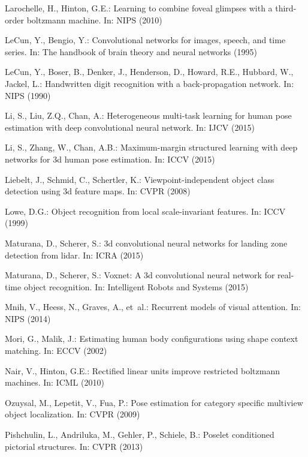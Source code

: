\documentclass[runningheads]{llncs}
\begin{document}
\begin{thebibliography}{10}
	Larochelle, H., Hinton, G.E.: Learning to combine foveal glimpses with a
	third-order boltzmann machine. In: NIPS (2010)

	LeCun, Y., Bengio, Y.: Convolutional networks for images, speech, and time
	series. In: The handbook of brain theory and neural networks (1995)

	LeCun, Y., Boser, B., Denker, J., Henderson, D., Howard, R.E., Hubbard, W.,
	Jackel, L.: Handwritten digit recognition with a back-propagation network.
	In: NIPS (1990)

	Li, S., Liu, Z.Q., Chan, A.: Heterogeneous multi-task learning for human pose
	estimation with deep convolutional neural network. In: IJCV (2015)

	Li, S., Zhang, W., Chan, A.B.: Maximum-margin structured learning with deep
	networks for 3d human pose estimation. In: ICCV (2015)

	Liebelt, J., Schmid, C., Schertler, K.: Viewpoint-independent object class
	detection using 3d feature maps. In: CVPR (2008)

	Lowe, D.G.: Object recognition from local scale-invariant features. In: ICCV
	(1999)

	Maturana, D., Scherer, S.: 3d convolutional neural networks for landing zone
	detection from lidar. In: ICRA (2015)

	Maturana, D., Scherer, S.: Voxnet: A 3d convolutional neural network for
	real-time object recognition. In: Intelligent Robots and Systems (2015)

	Mnih, V., Heess, N., Graves, A., et~al.: Recurrent models of visual attention.
	In: NIPS (2014)

	Mori, G., Malik, J.: Estimating human body configurations using shape context
	matching. In: ECCV (2002)

	Nair, V., Hinton, G.E.: Rectified linear units improve restricted boltzmann
	machines. In: ICML (2010)

	Ozuysal, M., Lepetit, V., Fua, P.: Pose estimation for category specific
	multiview object localization. In: CVPR (2009)

	Pishchulin, L., Andriluka, M., Gehler, P., Schiele, B.: Poselet conditioned
	pictorial structures. In: CVPR (2013)


\end{thebibliography}
\end{document}
